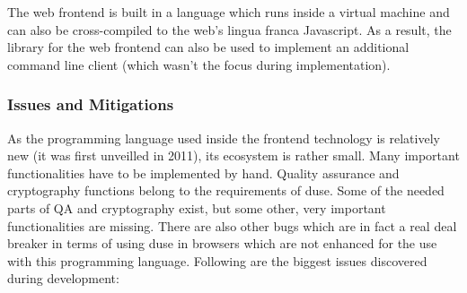 The web frontend is built in a language which runs inside a virtual machine and
can also be cross-compiled to the web's lingua franca Javascript. As a result,
the library for the web frontend can also be used to implement an
additional command line client (which wasn't the focus during implementation).

\subsubsection{Issues and Mitigations}

As the programming language used inside the frontend technology is relatively
new (it was first unveilled in 2011), its ecosystem is rather small. Many
important functionalities have to be implemented by hand. Quality assurance
and cryptography functions belong to the requirements of duse. Some of the
needed parts of QA and cryptography exist, but some other, very important
functionalities are missing. There are also other bugs which are in fact a
real deal breaker in terms of using duse in browsers which are not enhanced
for the use with this programming language. Following are the biggest issues
discovered during development:

